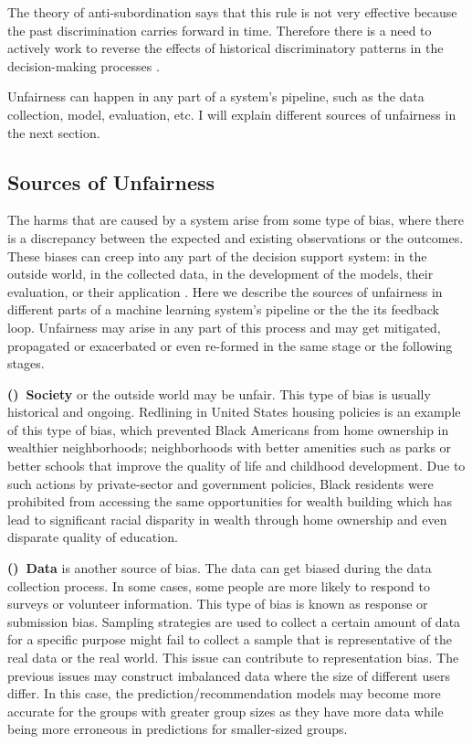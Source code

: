         The theory of anti-subordination says that this rule is not very effective because the past discrimination carries forward in time. Therefore there is a need to actively work to reverse the effects of historical discriminatory patterns in the decision-making processes \cite{barocas2016big}.
    
    Unfairness can happen in any part of a system's pipeline, such as the data collection, model, evaluation, etc. I will explain different sources of unfairness in the next section.

    \subsection{Sources of Unfairness}
        The harms that are caused by a system arise from some type of bias, where there is a discrepancy between the expected and existing observations or the outcomes. These biases can creep into any part of the decision support system: in the outside world, in the collected data, in the development of the models, their evaluation, or their application \cite{sureshframework2019}. Here we describe the sources of unfairness in different parts of a machine learning system's pipeline or the the its feedback loop. Unfairness may arise in any part of this process and may get mitigated, propagated or exacerbated or even re-formed in the same stage or the following stages.
        
        
        \textbf{()~Society} or the outside world may be unfair. This type of bias is usually historical and ongoing. Redlining in United States housing policies \cite{rothstein2017color} is an example of this type of bias, which prevented Black Americans from home ownership in wealthier neighborhoods; neighborhoods with better amenities such as parks or better schools that improve the quality of life and childhood development. Due to such actions by private-sector and government policies, Black residents were prohibited from accessing the same opportunities for wealth building which has lead to significant racial disparity in wealth through home ownership and even disparate quality of education.
        
        \textbf{()~Data} is another source of bias. The data can get biased during the data collection process. In some cases, some people are more likely to respond to surveys or volunteer information. This type of bias is known as response or submission bias. Sampling strategies are used to collect a certain amount of data for a specific purpose might fail to collect a sample that is representative of the real data or the real world. This issue can contribute to representation bias. The previous issues may construct imbalanced data where the size of different users differ. In this case, the prediction/recommendation models may become more accurate for the groups with greater group sizes as they have more data while being more erroneous in predictions for smaller-sized groups.
        
